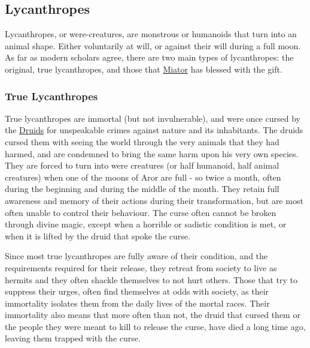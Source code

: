 \subsection{Lycanthropes}
\label{sec:Lycanthropes}

Lycanthropes, or were-creatures, are monstrous or humanoids that turn into an
animal shape. Either voluntarily at will, or against their will during a full
moon. As far as modern scholars agree, there are two main types of
lycanthropes: the original, true lycanthropes, and those that
\hyperref[sec:Three Kings]{Miator} has blessed with the gift.

\subsubsection{True Lycanthropes}
\label{sec:True Lycanthropes}


True lycanthropes are immortal (but not invulnerable), and were once cursed by
the \hyperref[sec:Druid]{Druids} for unspeakable crimes against nature and its
inhabitants. The druids cursed them with seeing the world through the very
animals that they had harmed, and are condemned to bring the same harm upon
his very own species. They are forced to turn into were creatures (or half
humanoid, half animal creatures) when one of the moons of Aror are full - so
twice a month, often during the beginning and during the middle of the
month. They retain full awareness and memory of their actions during their
transformation, but are most often unable to control their behaviour. The
curse often cannot be broken through divine magic, except when a horrible or
sadistic condition is met, or when it is lifted by the druid that spoke the
curse.

Since most true lycanthropes are fully aware of their condition, and the
requirements required for their release, they retreat from society to live as
hermits and they often shackle themselves to not hurt others. Those that try
to suppress their urges, often find themselves at odds with society, as their
immortality isolates them from the daily lives of the mortal races. Their
immortality also means that more often than not, the druid that cursed them or
the people they were meant to kill to release the curse, have died a long time
ago, leaving them trapped with the curse.


